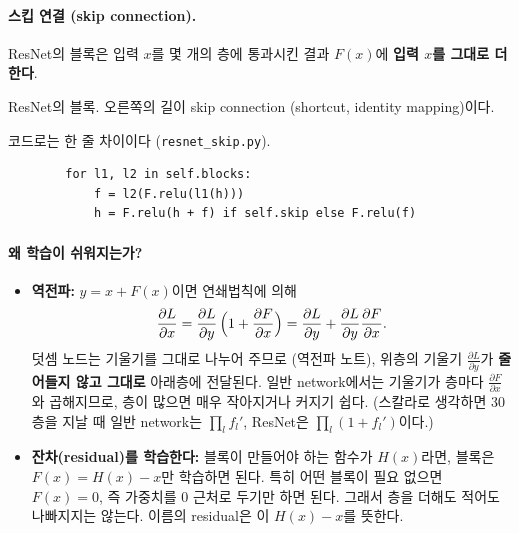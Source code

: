 \documentclass[11pt,a4paper]{article}
\newcommand{\pd}[2]{\frac{\partial #1}{\partial #2}}
\begin{document}
\paragraph{스킵 연결 (skip connection).}
ResNet의 블록은 입력 $x$를 몇 개의 층에 통과시킨 결과 $F(x)$에 \textbf{입력 $x$를 그대로 더한다}.

\begin{center}
\begin{minipage}{\textwidth}\centering
{}

\small ResNet의 블록. 오른쪽의 길이 skip connection (shortcut, identity mapping)이다.
\end{minipage}
\end{center}

코드로는 한 줄 차이이다 (\texttt{resnet\_skip.py}).

\begin{lstlisting}
        for l1, l2 in self.blocks:
            f = l2(F.relu(l1(h)))
            h = F.relu(h + f) if self.skip else F.relu(f)
\end{lstlisting}

\paragraph{왜 학습이 쉬워지는가?}
\begin{itemize}[leftmargin=1.5em]
\item \textbf{역전파:} $y=x+F(x)$이면 연쇄법칙에 의해
\[
\pd{L}{x}=\pd{L}{y}\,\Bigl(1+\pd{F}{x}\Bigr)=\pd{L}{y}+\pd{L}{y}\pd{F}{x} .
\]
덧셈 노드는 기울기를 그대로 나누어 주므로 (역전파 노트), 위층의 기울기 $\pd{L}{y}$가 \textbf{줄어들지 않고 그대로} 아래층에 전달된다.
일반 network에서는 기울기가 층마다 $\pd{F}{x}$와 곱해지므로, 층이 많으면 매우 작아지거나 커지기 쉽다.
(스칼라로 생각하면 $30$층을 지날 때 일반 network는 $\prod_l f_l'$, ResNet은 $\prod_l(1+f_l')$이다.)
\item \textbf{잔차(residual)를 학습한다:} 블록이 만들어야 하는 함수가 $H(x)$라면, 블록은 $F(x)=H(x)-x$만 학습하면 된다.
특히 어떤 블록이 필요 없으면 $F(x)=0$, 즉 가중치를 $0$ 근처로 두기만 하면 된다.
그래서 층을 더해도 적어도 나빠지지는 않는다. 이름의 residual은 이 $H(x)-x$를 뜻한다.
\end{itemize}
\end{document}
